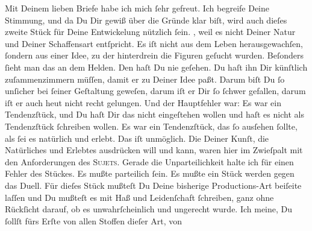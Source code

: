 \pstart
           Mit Deinem lieben Briefe habe ich mich ſehr gefreut. Ich begreife Deine Stimmung, und
               da Du Dir gewiß über die Gründe klar biſt, wird auch dieſes zweite Stück für Deine Entwickelung nützlich ſein.
                  \label{K_L02790-9v}\label{K_L02790-9}, weil es nicht Deiner Natur und Deiner Schaffensart entſpricht. Es iſt nicht
               aus dem Leben herausgewachſen, ſondern aus einer Idee, zu der hinterdrein die Figuren
               geſucht wurden. Beſonders {\pb}ſieht man das an dem Helden. Den haſt Du nie
               geſehen. Du haſt ihn Dir künſtlich zuſammenzimmern müſſen, damit er zu Deiner Idee
               paßt. Darum biſt Du ſo unſicher bei ſeiner Geſtaltung geweſen, darum iſt er Dir ſo
               ſchwer gefallen, darum iſt er auch heut nicht recht gelungen. Und der Hauptfehler
               war: Es war ein Tendenzſtück, und Du haſt Dir das nicht eingeſtehen wollen und haſt
               es nicht als Tendenzſtück ſchreiben wollen. Es war ein Tendenzſtück, das ſo ausſehen
               ſollte, als ſei es natürlich {\pb}und erlebt. Das iſt
               unmöglich. Die \label{K_L02790-10v}\label{K_L02790-10}
               Deiner Kunſt, die Natürliches und Erlebtes ausdrücken will und kann, waren hier im
               Zwieſpalt mit den Anforderungen des \textsc{Sujets}. Gerade die
               Unparteilichkeit halte ich für einen Fehler des Stückes. Es mußte parteilich ſein. Es mußte ein Stück werden gegen das Duell.
               Für dieſes Stück mußteſt Du
               Deine bisherige Productions-Art beiſeite laſſen und \introOben{}Du\introOben{}
               mußteſt es mit Haß und Leidenſchaft ſchreiben,  ganz
               ohne Rückſicht darauf, ob es unwahrſcheinlich und {\pb}ungerecht wurde. Ich meine, Du ſollſt fürs Erſte von allen Stoffen dieſer Art, von
